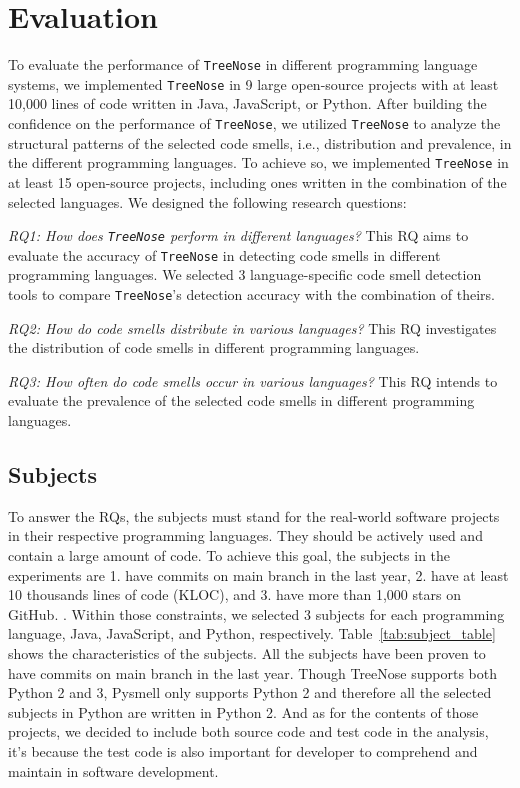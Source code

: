 

\section{Evaluation}
\label{sec:evaluation}

To evaluate the performance of \texttt{TreeNose} in different programming language systems,
we implemented \texttt{TreeNose} in 9 large open-source projects with at least 10,000 lines of code written in Java, JavaScript, or
Python. After building the confidence on the performance of \texttt{TreeNose}, we utilized \texttt{TreeNose} to analyze the structural patterns
of the selected code smells, i.e., distribution and prevalence, in the different programming languages. To achieve so, we implemented \texttt{TreeNose} in at least 15 open-source projects, including
ones written in the combination of the selected languages. We designed the following research questions:

{\it RQ1: How does \texttt{TreeNose} perform in different languages?}
This RQ aims to evaluate the accuracy of \texttt{TreeNose} in detecting code smells in different programming languages. 
We selected 3 language-specific code smell detection tools to compare \texttt{TreeNose}'s detection accuracy with the combination of theirs.

{\it RQ2: How do code smells distribute in various languages?}
This RQ investigates the distribution of code smells in different programming languages.

{\it RQ3: How often do code smells occur in various languages?}
This RQ intends to evaluate the prevalence of the selected code smells in different programming languages.

\subsection{Subjects}
\label{sec:subjects}

To answer the RQs, the subjects must stand for the real-world software projects in their respective 
programming languages. They should be actively used and contain a large amount of code. To achieve this goal, the subjects in the 
experiments are 1. have commits on main branch in the last year, 2. have at least 10 thousands lines of code (KLOC), and 3. have more than 1,000 stars on GitHub.
. Within those constraints, we selected 3 subjects for each programming language, Java, JavaScript, and Python, respectively.
Table~\ref{tab:subject_table} shows the characteristics of the subjects. All the subjects have been proven to have commits on main branch in the last year.
Though TreeNose supports both Python 2 and 3, Pysmell only supports Python 2 and therefore all the selected subjects in Python are written in Python 2.
And as for the contents of those projects, we decided to include both source code and test code in the analysis, 
it's because the test code is also important for developer to comprehend and maintain in software development.

